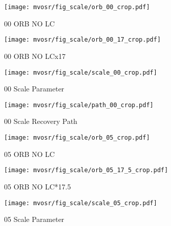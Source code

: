 
\begin{figure*}[h]
    \centering
    \begin{subfigure}[t]{0.23\textwidth}
    \texttt{[image: mvosr/fig\_scale/orb\_00\_crop.pdf]}
    \caption{00 ORB NO LC}
    \label{fig:orb_path_00}
    \vspace{4pt}
    \end{subfigure}
    \begin{subfigure}[t]{0.23\textwidth}
        \texttt{[image: mvosr/fig\_scale/orb\_00\_17\_crop.pdf]}
        \caption{00 ORB NO LCx17}
        \label{fig:orb_path_00_17}
        \vspace{4pt}
        \end{subfigure}
        \begin{subfigure}[t]{0.23\textwidth}
            \texttt{[image: mvosr/fig\_scale/scale\_00\_crop.pdf]}
            \caption{00 Scale Parameter}
            \label{fig:scale_00}
            \vspace{4pt}
            \end{subfigure}
            \begin{subfigure}[t]{0.23\textwidth}
                \texttt{[image: mvosr/fig\_scale/path\_00\_crop.pdf]}
                \caption{00 Scale Recovery Path}
                \label{fig:scaled_path_00}
                \vspace{4pt}
                \end{subfigure}
    \begin{subfigure}[t]{0.23\textwidth}
    \texttt{[image: mvosr/fig\_scale/orb\_05\_crop.pdf]}
    \label{fig:orb_path_05}
    \caption{ 05 ORB NO LC}
    \vspace{4pt}
    \end{subfigure}
    \begin{subfigure}[t]{0.23\textwidth}
        \texttt{[image: mvosr/fig\_scale/orb\_05\_17\_5\_crop.pdf]}
        \label{fig:orb_path_05_175}
        \caption{05 ORB NO LC*17.5}
        \vspace{4pt}
        \end{subfigure}
        \begin{subfigure}[t]{0.23\textwidth}
            \texttt{[image: mvosr/fig\_scale/scale\_05\_crop.pdf]}
            \label{fig:scale_05}
            \caption{05 Scale Parameter}
            \vspace{4pt}
            \end{subfigure}
            \begin{subfigure}[t]{0.23\textwidth}

\end{subfigure}
\end{figure*}
